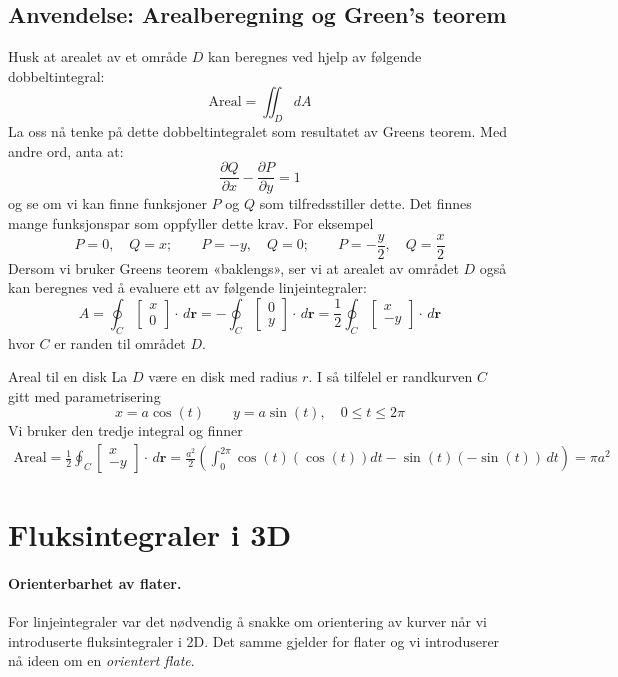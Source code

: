 %
\subsection{Anvendelse: Arealberegning og Green's teorem}
Husk at arealet av et område \( D \) kan beregnes ved hjelp av følgende dobbeltintegral:
\[
\text{Areal} = \iint_D dA
\]
La oss nå tenke på dette dobbeltintegralet som resultatet av Greens teorem. Med andre ord, anta at:
\[
\frac{\partial Q}{\partial x} - \frac{\partial P}{\partial y} = 1
\]
og se om vi kan finne funksjoner \( P \) og \( Q \) som tilfredsstiller dette.
Det finnes mange funksjonspar som oppfyller dette krav. For eksempel
\[
P = 0,\quad Q = x; \qquad 
P = -y,\quad Q = 0;
\qquad 
P = -\frac{y}{2},\quad Q = \frac{x}{2}
\]
Dersom vi bruker Greens teorem «baklengs», ser vi at arealet av området \( D \) også kan beregnes ved å evaluere ett av følgende linjeintegraler:
\[
A = \oint_C \begin{bmatrix} x\\ 0\end{bmatrix} \cdot \, d\mathbf{r} = -\oint_C\begin{bmatrix} 0\\ y\end{bmatrix} \cdot \, d\mathbf{r} = \frac{1}{2} \oint_C \begin{bmatrix} x\\ -y\end{bmatrix} \cdot \, d\mathbf{r}
\]
hvor \( C \) er randen til området \( D \).
\begin{eks}{Areal til en disk}
La $D$ være en disk med radius $r$. I så tilfelel er randkurven $C$ gitt med parametrisering
\[x=a\cos (t) \qquad y= a \sin(t), \quad 0\leq t \leq 2\pi \]
Vi bruker den tredje integral og finner
\begin{align*}
\text{Areal} = \frac{1}{2}\oint_C\begin{bmatrix} x\\-y\end{bmatrix} \cdot \, d\mathbf{r} = \frac{a^2}{2}\left(\int_0^{2\pi} \cos (t) (\cos(t)) dt - \sin(t) (-\sin(t)) \, dt \right) = \pi a^2
\end{align*}
\end{eks}

%
%
%
\section{Fluksintegraler i 3D}\label{sect:fluks3d}

\paragraph{Orienterbarhet av flater. }For linjeintegraler var det nødvendig å snakke om orientering av kurver når vi introduserte fluksintegraler i 2D. Det samme gjelder for flater og vi introduserer nå ideen om en \emph{orientert flate}.

